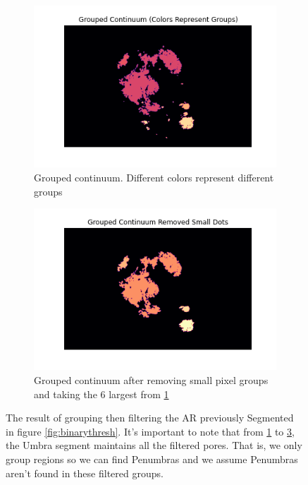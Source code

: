 \documentclass[defaultstyle,11pt]{thesis}
\begin{document}
\begin{enumerate}
    
\begin{figure}[h]
\centering
\begin{subfigure}[b]{.45\textwidth}
  \centering
  \includegraphics[width=.8\linewidth]{ThesisFilePkg/figures/data/segments_grouped.png}
  \caption{Grouped continuum. Different colors represent different groups}
  \label{fig:grouped}
\end{subfigure}%
\quad
\begin{subfigure}[b]{.45\textwidth}
  \centering
  \includegraphics[width=.8\linewidth]{ThesisFilePkg/figures/data/segments_grouped_filtered.png}
  \caption{Grouped continuum after removing small pixel groups and taking the 6 largest from \ref{fig:grouped}}
  \label{fig:groupedfiltered}
\end{subfigure}
\caption{The result of grouping then filtering the AR previously Segmented in figure \ref{fig:binarythresh}. It's important to note that from \ref{fig:grouped} to \ref{fig:groupedfiltered}, the Umbra segment maintains all the filtered pores. That is, we only group regions so we can find Penumbras and we assume Penumbras aren't found in these filtered groups.}
\end{figure}
    

\end{enumerate}
\end{document}
